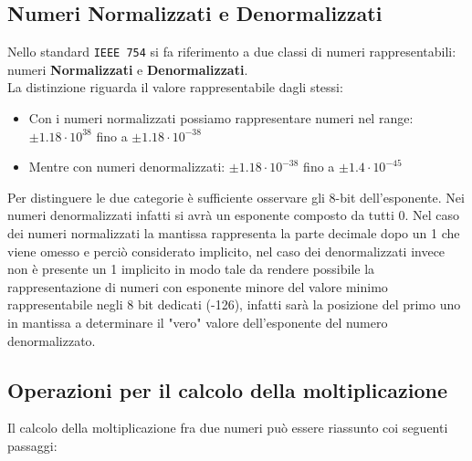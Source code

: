 \documentclass[twoside,11pt]{article}
\begin{document}
\subsection{Numeri Normalizzati e Denormalizzati}
Nello standard \verb|IEEE 754| si fa riferimento a due classi di numeri rappresentabili: numeri \textbf{Normalizzati} e \textbf{Denormalizzati}.\\
La distinzione riguarda il valore rappresentabile dagli stessi:
\begin{itemize}[noitemsep]
    \item Con i numeri normalizzati possiamo rappresentare numeri nel range: $\pm 1.18 \cdot 10^{38}$ fino a $\pm 1.18 \cdot 10^{-38}$
    \item Mentre con numeri denormalizzati: $\pm 1.18 \cdot 10^{-38}$ fino a $\pm 1.4 \cdot 10^{-45}$
\end{itemize}
Per distinguere le due categorie è sufficiente osservare gli 8-bit dell'esponente. Nei numeri denormalizzati infatti si avrà un esponente composto da tutti 0.
Nel caso dei numeri normalizzati la mantissa rappresenta la parte decimale dopo un 1 che viene omesso e perciò considerato implicito, nel caso dei denormalizzati invece non è presente un 1 implicito in modo tale da rendere possibile la rappresentazione di numeri con esponente minore del valore minimo rappresentabile negli 8 bit dedicati (-126), infatti sarà la posizione del primo uno in mantissa a determinare il "vero" valore dell'esponente del numero denormalizzato.

\subsection{Operazioni per il calcolo della moltiplicazione}
Il calcolo della moltiplicazione fra due numeri può essere riassunto coi seguenti passaggi:
\end{document}
